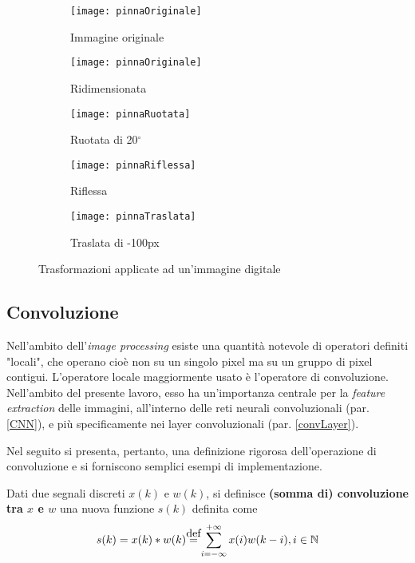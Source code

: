 \begin{figure}[h]
\centering

\begin{subfigure}[b]{\textwidth}
\centering
\texttt{[image: pinnaOriginale]}
\caption{Immagine originale}
\end{subfigure}

\begin{subfigure}[b]{0.24\textwidth}
\centering
\texttt{[image: pinnaOriginale]}
\caption{Ridimensionata}
\end{subfigure}
\begin{subfigure}[b]{0.24\textwidth}
\centering
\texttt{[image: pinnaRuotata]}
\caption{Ruotata di 20$^\circ$}
\end{subfigure}
\begin{subfigure}[b]{0.24\textwidth}
\centering
\texttt{[image: pinnaRiflessa]}
\caption{Riflessa}
\end{subfigure}
\begin{subfigure}[b]{0.24\textwidth}
\centering
\texttt{[image: pinnaTraslata]}
\caption{Traslata di -100px}
\end{subfigure}

\caption{Trasformazioni applicate ad un'immagine digitale}
\label{fig:trasformazioni}
\end{figure}

\subsection{Convoluzione}
Nell’ambito dell’\textit{image processing} esiste una quantità notevole di operatori definiti "locali", che operano cioè non su un singolo pixel ma su un gruppo di pixel contigui.
L’operatore locale maggiormente usato è l’operatore di convoluzione. Nell'ambito del presente lavoro, esso ha un'importanza centrale per la \textit{feature extraction} delle immagini, all'interno delle reti neurali convoluzionali (par. \ref{CNN}), e più specificamente nei layer convoluzionali (par. \ref{convLayer}).


Nel seguito si presenta, pertanto, una definizione rigorosa dell'operazione di convoluzione e si forniscono semplici esempi di implementazione.

Dati due segnali discreti $x(k)$ e $w(k)$, si definisce \textbf{(somma di) convoluzione tra $x$ e $w$} una nuova funzione $s(k)$ definita come \begin{equation*}
s(k)=x(k)\ast w(k)\eqdef \sum_{i=-\infty}^{+\infty}x(i)w(k-i), i\in\Z
\end{equation*}

